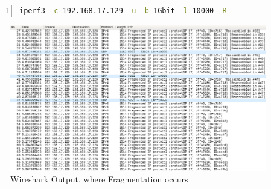 \begin{lstlisting}[language=sh, caption = {Example, where Fragmentation occurs}, captionpos=b, numbers=left, frame=single, breaklines=true, breakatwhitespace=true, showstringspaces=false, label={Example, where Fragmentation occurs}]
iperf3 -c 192.168.17.129 -u -b 1Gbit -l 10000 -R
\end{lstlisting}

\begin{figure}[h]
	\centering
	\includegraphics[width=\textwidth]{img/wireshark_l_10000_b_1Gbit.png}
	\caption{Wireshark Output, where Fragmentation occurs}
	\label{Wireshark Output, where Fragmentation occurs}
\end{figure}